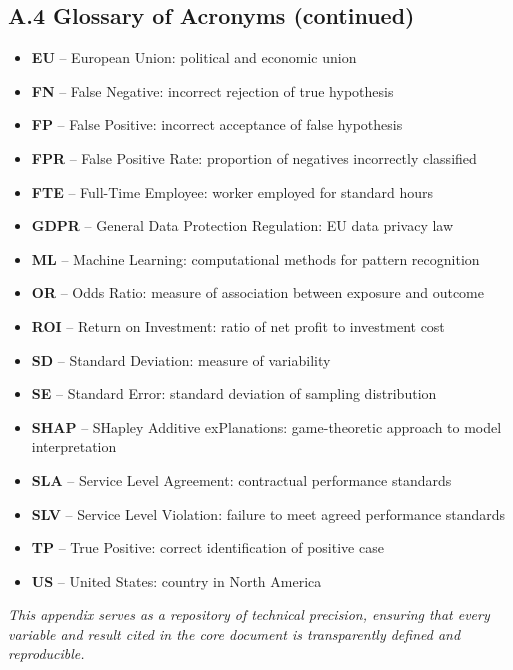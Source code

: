 \newpage
\subsection*{A.4 Glossary of Acronyms (continued)}

\begin{itemize}
    \item \textbf{EU} -- European Union: political and economic union
    \item \textbf{FN} -- False Negative: incorrect rejection of true hypothesis
    \item \textbf{FP} -- False Positive: incorrect acceptance of false hypothesis
    \item \textbf{FPR} -- False Positive Rate: proportion of negatives incorrectly classified
    \item \textbf{FTE} -- Full-Time Employee: worker employed for standard hours
    \item \textbf{GDPR} -- General Data Protection Regulation: EU data privacy law
    \item \textbf{ML} -- Machine Learning: computational methods for pattern recognition
    \item \textbf{OR} -- Odds Ratio: measure of association between exposure and outcome
    \item \textbf{ROI} -- Return on Investment: ratio of net profit to investment cost
    \item \textbf{SD} -- Standard Deviation: measure of variability
    \item \textbf{SE} -- Standard Error: standard deviation of sampling distribution
    \item \textbf{SHAP} -- SHapley Additive exPlanations: game-theoretic approach to model interpretation
    \item \textbf{SLA} -- Service Level Agreement: contractual performance standards
    \item \textbf{SLV} -- Service Level Violation: failure to meet agreed performance standards
    \item \textbf{TP} -- True Positive: correct identification of positive case
    \item \textbf{US} -- United States: country in North America
\end{itemize}

\vspace{1em}

\noindent\textit{This appendix serves as a repository of technical precision, ensuring that every variable and result cited in the core document is transparently defined and reproducible.}